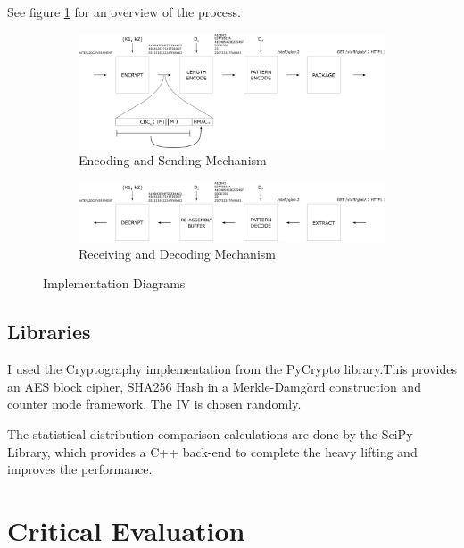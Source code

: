 \documentclass[ %
                    author={Samuel Russell},
                supervisor={Prof. Bogdan Warinschi},
                    degree={MEng},
                     title={Innocuous Ciphertexts},
                  subtitle={The DE-CENSOR Scheme},
                      type={research},
                      year={2018} ]{dissertation}
\begin{document}
See figure \ref{fig:imp-diag} for an overview of the process.

\begin{figure}[b]
\begin{subfigure}{\textwidth}
\includegraphics[scale=0.9]{diagram-enc}
\caption{Encoding and Sending Mechanism}
\end{subfigure}

\begin{subfigure}{\textwidth}
\includegraphics[scale=0.9]{diagram-dec}
\caption{Receiving and Decoding Mechanism}
\end{subfigure}
\caption{Implementation Diagrams}
\label{fig:imp-diag}
\end{figure}

\section{Libraries}

I used the Cryptography implementation from the PyCrypto library.This provides an AES block cipher, SHA256 Hash in a Merkle-Damg$\mathring{a}$rd construction and counter mode framework. The IV is chosen randomly.

The statistical distribution comparison calculations are done by the SciPy Library, which provides a C++ back-end to complete the heavy lifting and improves the performance.


\chapter{Critical Evaluation}
\label{chap:evaluation}
\end{document}
